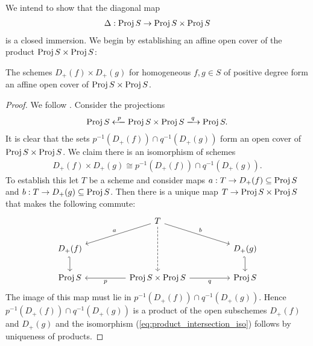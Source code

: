\documentclass{article}
\begin{document}
We intend to show that the diagonal map
\begin{align}\label{eq:diagonal_map}
  \Delta : \operatorname{Proj} S \to \operatorname{Proj} S \times \operatorname{Proj} S
\end{align}
is a closed immersion. We begin by establishing an affine open
cover of the product $\operatorname{Proj} S\times \operatorname{Proj} S$:
\begin{lemma}
  The schemes $D_+(f)\times D_+(g)$ for homogeneous $f,g\in S$
  of positive degree form an affine open cover of $\operatorname{Proj} S\times \operatorname{Proj} S$.
  \begin{proof}
    We follow \cite[\href{https://stacks.math.columbia.edu/tag/01JS}{Tag 01JS}]{stacks-project}.
    Consider the projections
    \begin{align*}
      \Proj S \xlongleftarrow{p} \Proj S\times \Proj S \xlongrightarrow{q} \Proj S.
    \end{align*}
    It is clear that the sets ${p}^{-1}(D_+(f))\cap{q}^{-1}(D_+(g))$
    form an open cover of $\operatorname{Proj} S\times \operatorname{Proj} S$. We claim there is an isomorphism of
    schemes
    \begin{align}\label{eq:product_intersection_iso}
      D_+(f)\times D_+(g) \cong {p}^{-1}(D_+(f))\cap{q}^{-1}(D_+(g)).
    \end{align}
    To establish this let $T$ be a scheme and consider maps
    $a:T\to D_+(f)\subseteq \operatorname{Proj} S$ and $b:T\to D_+(g)\subseteq \operatorname{Proj} S$.
    Then there is a unique map $T \to \operatorname{Proj} S\times \operatorname{Proj} S$ that makes the
    following commute:
    \begin{equation}
      \begin{tikzcd}
  && T \\
        {D_+(f)} &&&& {D_+(g)} \\
        \Proj S && {\Proj S\times \Proj S} && \Proj S
        \arrow["p", from=3-3, to=3-1]
        \arrow["q"', from=3-3, to=3-5]
        \arrow[hook', from=2-1, to=3-1]
        \arrow[hook', from=2-5, to=3-5]
        \arrow["a"', from=1-3, to=2-1]
        \arrow[dashed, from=1-3, to=3-3]
        \arrow["b", from=1-3, to=2-5]
      \end{tikzcd}
    \end{equation}
    The image of this map must lie in ${p}^{-1}(D_+(f))\cap{q}^{-1}(D_+(g))$. Hence ${p}^{-1}(D_+(f))\cap{q}^{-1}(D_+(g))$ is a product of the
    open subschemes $D_+(f)$ and $D_+(g)$ and the isomorphism
    (\ref{eq:product_intersection_iso}) follows by uniqueness of products.
  \end{proof}
\end{lemma}
\end{document}
